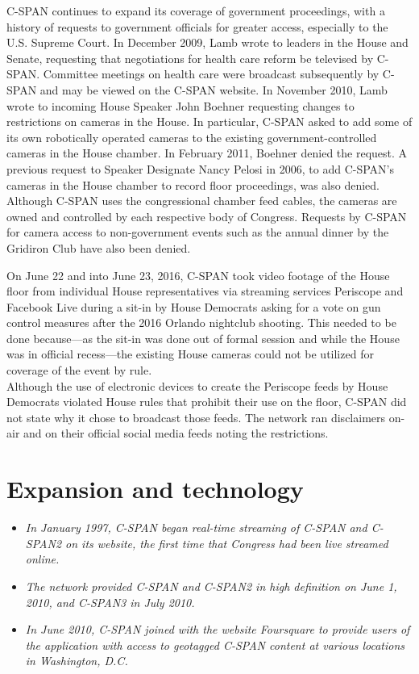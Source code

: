 C-SPAN continues to expand its coverage of government proceedings, with
a history of requests to government officials for greater access,
especially to the U.S. Supreme Court. In December 2009, Lamb wrote to
leaders in the House and Senate, requesting that negotiations for health
care reform be televised by C-SPAN. Committee meetings on health care
were broadcast subsequently by C-SPAN and may be viewed on the C-SPAN
website. In November 2010, Lamb wrote to incoming House Speaker John
Boehner requesting changes to restrictions on cameras in the House. In
particular, C-SPAN asked to add some of its own robotically operated
cameras to the existing government-controlled cameras in the House
chamber. In February 2011, Boehner denied the request. A previous
request to Speaker Designate Nancy Pelosi in 2006, to add C-SPAN's
cameras in the House chamber to record floor proceedings, was also
denied. Although C-SPAN uses the congressional chamber feed cables, the
cameras are owned and controlled by each respective body of Congress.
Requests by C-SPAN for camera access to non-government events such as
the annual dinner by the Gridiron Club have also been denied.

On June 22 and into June 23, 2016, C-SPAN took video footage of the
House floor from individual House representatives via streaming services
Periscope and Facebook Live during a sit-in by House Democrats asking
for a vote on gun control measures after the 2016 Orlando nightclub
shooting. This needed to be done because---as the sit-in was done out of
formal session and while the House was in official recess---the existing
House cameras could not be utilized for coverage of the event by rule.\\
Although the use of electronic devices to create the Periscope feeds by
House Democrats violated House rules that prohibit their use on the
floor, C-SPAN did not state why it chose to broadcast those feeds. The
network ran disclaimers on-air and on their official social media feeds
noting the restrictions.

\section{Expansion and technology}\label{expansion-and-technology}

\begin{itemize}
\item
  \emph{In January 1997, C-SPAN began real-time streaming of C-SPAN and
  C-SPAN2 on its website, the first time that Congress had been live
  streamed online.}
\item
  \emph{The network provided C-SPAN and C-SPAN2 in high definition on
  June 1, 2010, and C-SPAN3 in July 2010.}
\item
  \emph{In June 2010, C-SPAN joined with the website Foursquare to
  provide users of the application with access to geotagged C-SPAN
  content at various locations in Washington, D.C.}
\end{itemize}


